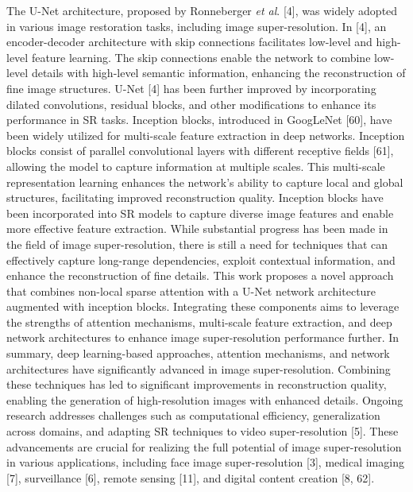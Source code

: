 \documentclass{ieeeaccess}
\begin{document}
The U-Net architecture, proposed by Ronneberger \textit{et al}. [4], was widely adopted in various image restoration tasks, including image super-resolution. In [4], an encoder-decoder architecture with skip connections facilitates low-level and high-level feature learning. The skip connections enable the network to combine low-level details with high-level semantic information, enhancing the reconstruction of fine image structures. U-Net [4] has been further improved by incorporating dilated convolutions, residual blocks, and other modifications to enhance its performance in SR tasks.
Inception blocks, introduced in GoogLeNet [60], have been widely utilized for multi-scale feature extraction in deep networks. Inception blocks consist of parallel convolutional layers with different receptive fields [61], allowing the model to capture information at multiple scales. This multi-scale representation learning enhances the network's ability to capture local and global structures, facilitating improved reconstruction quality. Inception blocks have been incorporated into SR models to capture diverse image features and enable more effective feature extraction.
While substantial progress has been made in the field of image super-resolution, there is still a need for techniques that can effectively capture long-range dependencies, exploit contextual information, and enhance the reconstruction of fine details. This work proposes a novel approach that combines non-local sparse attention with a U-Net network architecture augmented with inception blocks. Integrating these components aims to leverage the strengths of attention mechanisms, multi-scale feature extraction, and deep network architectures to enhance image super-resolution performance further.
In summary, deep learning-based approaches, attention mechanisms, and network architectures have significantly advanced in image super-resolution. Combining these techniques has led to significant improvements in reconstruction quality, enabling the generation of high-resolution images with enhanced details. Ongoing research addresses challenges such as computational efficiency, generalization across domains, and adapting SR techniques to video super-resolution [5]. These advancements are crucial for realizing the full potential of image super-resolution in various applications, including face image super-resolution [3], medical imaging [7], surveillance [6], remote sensing [11], and digital content creation [8, 62].
\end{document}
